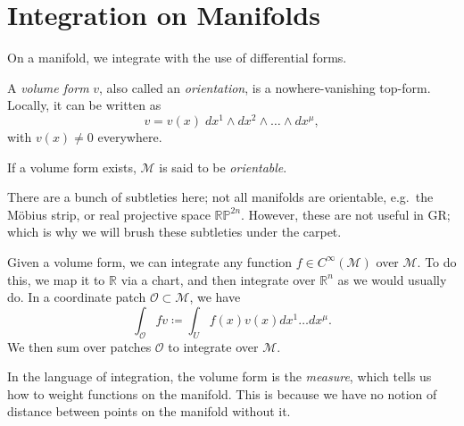 \section{Integration on Manifolds}%
\label{sec:integration}

On a manifold, we integrate with the use of differential forms.
\begin{definition}
  A \emph{volume form} $v$, also called an \emph{orientation}, is a nowhere-vanishing top-form.
  Locally, it can be written as
  \begin{equation}
    v = v(x)\; dx^1 \wedge dx^2 \wedge \dots \wedge dx^\mu ,
  \end{equation}
  with $v(x) \neq 0$ everywhere.
\end{definition}
\begin{definition}[]
  If a volume form exists, $\mathcal{M}$ is said to be \emph{orientable}.
\end{definition}
\begin{leftbar}
  \begin{remark}
    There are a bunch of subtleties here; not all manifolds are orientable, e.g.~the Möbius strip, or real projective space $\mathbb{RP}^{2n}$.
    However, these are not useful in GR; which is why we will brush these subtleties under the carpet.
  \end{remark}
\end{leftbar}
\begin{definition}[integration]
  Given a volume form, we can integrate any function $f \in C^\infty(\mathcal{M})$ over $\mathcal{M}$.
  To do this, we map it to $\mathbb{R}$ via a chart, and then integrate over $\mathbb{R}^n$ as we would usually do.
  In a coordinate patch $\mathcal{O} \subset \mathcal{M}$, we have
  \begin{equation}
    \int_{\mathcal{O}} fv \coloneqq \int_{U} f(x) v(x) dx^1 \dots dx^\mu .
  \end{equation}
  We then sum over patches $\mathcal{O}$ to integrate over $\mathcal{M}$.
\end{definition}
\begin{leftbar}
  \begin{remark}
    In the language of integration, the volume form is the \emph{measure}, which tells us how to weight functions on the manifold. This is because we have no notion of distance between points on the manifold without it.
  \end{remark}
\end{leftbar}

